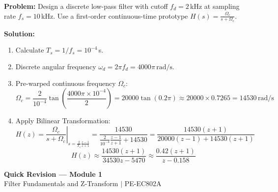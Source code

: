 \documentclass[12pt,a4paper]{article}
\begin{document}
\begin{tcolorbox}[examplebox, title={\textbf{Worked Example: Bilinear Transformation with Pre-warping}}]
\textbf{Problem:} Design a discrete low-pass filter with cutoff $f_d = 2\,$kHz at sampling rate $f_s = 10\,$kHz. Use a first-order continuous-time prototype $H(s) = \frac{\Omega_c}{s + \Omega_c}$.

\textbf{Solution:}
\begin{enumerate}[label=\textbf{\alph*.}, leftmargin=*, itemsep=2pt]
  \item Calculate $T_s = 1/f_s = 10^{-4}\,$s.
  \item Discrete angular frequency $\omega_d = 2\pi f_d = 4000\pi\,\text{rad/s}$.
  \item Pre-warped continuous frequency $\Omega_c$:
    \[
    \Omega_c = \frac{2}{10^{-4}} \tan\left(\frac{4000\pi \times 10^{-4}}{2}\right) = 20000 \tan(0.2\pi) \approx 20000 \times 0.7265 = 14530\,\text{rad/s}
    \]
  \item Apply Bilinear Transformation:
    \[
    H(z) = \left. \frac{\Omega_c}{s + \Omega_c} \right|_{s = \frac{2}{T_s}\frac{z-1}{z+1}} = \frac{14530}{\frac{2}{10^{-4}}\frac{z-1}{z+1} + 14530} = \frac{14530(z+1)}{20000(z-1) + 14530(z+1)}
    \]
    \[
    H(z) \approx \frac{14530(z+1)}{34530 z - 5470} \approx \frac{0.42(z+1)}{z - 0.158}
    \]
\end{enumerate}
\end{tcolorbox}

\newpage
\begin{center}
  {\large\bfseries\color{myred} Quick Revision --- Module 1}\\[3pt]
  {\small\color{mydark} Filter Fundamentals and Z-Transform $|$ PE-EC802A}
\end{center}
\noindent{\color{myred}\rule{\linewidth}{1.2pt}}
\vspace{4pt}
\end{document}
